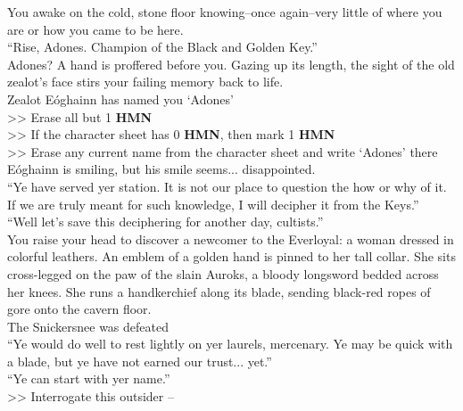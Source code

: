 You awake on the cold, stone floor knowing--once again--very little of where you are or how you came to be here.\\

“Rise, Adones. Champion of the Black and Golden Key.”\\

Adones? A hand is proffered before you. Gazing up its length, the sight of the old zealot’s face stirs your failing memory back to life.\\
 Zealot Eóghainn has named you ‘Adones’\\
>> Erase all but 1 \textbf{HMN}\\
>> If the character sheet has 0 \textbf{HMN}, then mark 1 \textbf{HMN}\\
>> Erase any current name from the character sheet and write ‘Adones’ there\\

Eóghainn is smiling, but his smile seems... disappointed.\\

“Ye have served yer station. It is not our place to question the how or why of it. If we are truly meant for such knowledge, I will decipher it from the Keys.”\\

“Well let’s save this deciphering for another day, cultists.”\\

You raise your head to discover a newcomer to the Everloyal: a woman dressed in colorful leathers. An emblem of a golden hand is pinned to her tall collar. She sits cross-legged on the paw of the slain Auroks, a bloody longsword bedded across her knees. She runs a handkerchief along its blade, sending black-red ropes of gore onto the cavern floor.\\
 The Snickersnee was defeated\\

“Ye would do well to rest lightly on yer laurels, mercenary. Ye may be quick with a blade, but ye have not earned our trust... yet.”\\

“Ye can start with yer name.”\\

>> Interrogate this outsider -- 